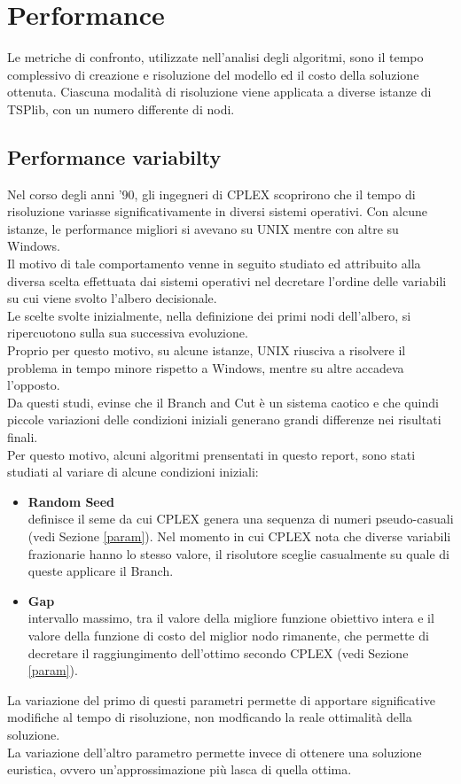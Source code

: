 \chapter{Performance}\label{PERF_PROF}
Le metriche di confronto, utilizzate nell'analisi degli algoritmi, sono il tempo complessivo di creazione e risoluzione del modello ed il costo della soluzione ottenuta. Ciascuna modalità di risoluzione viene applicata a diverse istanze di TSPlib, con un numero differente di nodi.  
\section{Performance variabilty}
Nel corso degli anni '90, gli ingegneri di CPLEX scoprirono che il tempo di risoluzione variasse significativamente in diversi sistemi operativi. Con alcune istanze, le performance migliori si avevano su UNIX mentre con altre su Windows.\\
Il motivo di tale comportamento venne in seguito studiato ed attribuito alla diversa scelta effettuata dai sistemi operativi nel decretare l'ordine delle variabili su cui viene svolto l'albero decisionale.\\
Le scelte svolte inizialmente, nella definizione dei primi nodi dell'albero, si ripercuotono sulla sua successiva evoluzione.\\
Proprio per questo motivo, su alcune istanze, UNIX riusciva a risolvere il problema in tempo minore rispetto a Windows, mentre su altre accadeva l'opposto.\\
Da questi studi, evinse che il Branch and Cut è un sistema caotico e che quindi piccole variazioni delle condizioni iniziali generano grandi differenze nei risultati finali.\\
Per questo motivo, alcuni algoritmi prensentati in questo report, sono stati studiati al variare di alcune condizioni iniziali:
\begin{itemize}
\item{\textbf{Random Seed}\\
definisce il seme da cui CPLEX genera una sequenza di numeri pseudo-casuali (vedi Sezione \ref{param}). Nel momento in cui CPLEX nota che diverse variabili frazionarie hanno lo stesso valore, il risolutore sceglie casualmente su quale di queste applicare il Branch.}
\item{\textbf{Gap}\\
intervallo massimo, tra il valore della migliore funzione obiettivo intera e il valore della funzione di costo del miglior nodo rimanente, che permette di decretare il raggiungimento dell'ottimo secondo CPLEX (vedi Sezione \ref{param}).}
\end{itemize}
La variazione del primo di questi parametri permette di apportare significative modifiche al tempo di risoluzione, non modficando la reale ottimalità della soluzione.\\
La variazione dell'altro parametro permette invece di ottenere una soluzione euristica, ovvero un'approssimazione più lasca di quella ottima.
 
